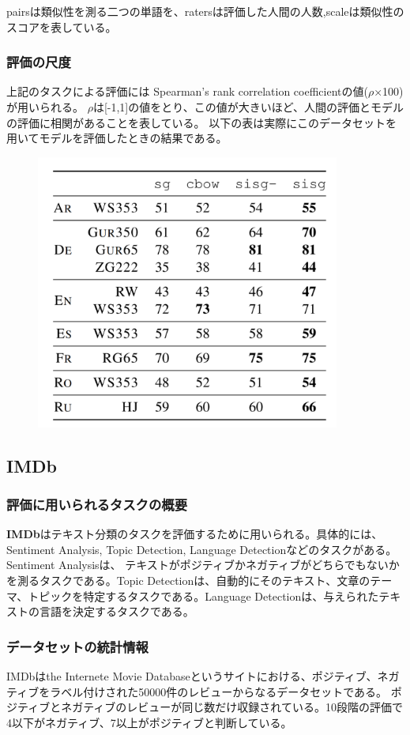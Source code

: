 \documentclass[a4j,11pt]{jarticle}
\begin{document}
pairsは類似性を測る二つの単語を、ratersは評価した人間の人数,scaleは類似性のスコアを表している。

\subsubsection*{評価の尺度}
上記のタスクによる評価には Spearman’s rank correlation coefficientの値($\rho$×100)が用いられる。
$\rho$は[-1,1]の値をとり、この値が大きいほど、人間の評価とモデルの評価に相関があることを表している。
以下の表は実際にこのデータセットを用いてモデルを評価したときの結果である。

\begin{figure}[hbtp]
    \centering
    \includegraphics[width=10cm]{p3-2.png}
\end{figure}

\newpage
\subsection{IMDb}
\subsubsection*{評価に用いられるタスクの概要}
\textbf{IMDb}はテキスト分類のタスクを評価するために用いられる。具体的には、Sentiment Analysis, Topic Detection, Language Detectionなどのタスクがある。
Sentiment Analysisは、 テキストがポジティブかネガティブがどちらでもないかを測るタスクである。Topic Detectionは、自動的にそのテキスト、文章のテーマ、トピックを特定するタスクである。Language Detectionは、与えられたテキストの言語を決定するタスクである。

\subsubsection*{データセットの統計情報}
IMDbはthe Internete Movie Databaseというサイトにおける、ポジティブ、ネガティブをラベル付けされた50000件のレビューからなるデータセットである。
ポジティブとネガティブのレビューが同じ数だけ収録されている。10段階の評価で4以下がネガティブ、7以上がポジティブと判断している。
\end{document}
